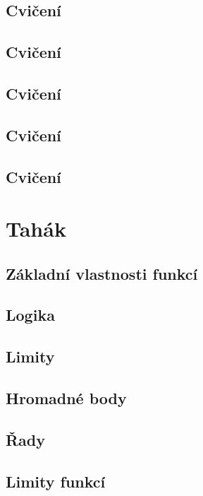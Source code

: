 \documentclass[a4paper,10pt]{book}
\begin{document}
	\section[4. Cvičení]{Cvičení}
 
	\section[5. Cvičení]{Cvičení}
 
	\section[6. Cvičení]{Cvičení}
 
	\section[7. Cvičení]{Cvičení}
 
	\section[8. Cvičení]{Cvičení}
 

\chapter{Tahák}
	\section{Základní vlastnosti funkcí}
	\section{Logika}
		
	\section{Limity}
		
		
	\section{Hromadné body}
	  
	\section{Řady}
	  
	\section{Limity funkcí}
	  
	  
	  
	  
\end{document}
